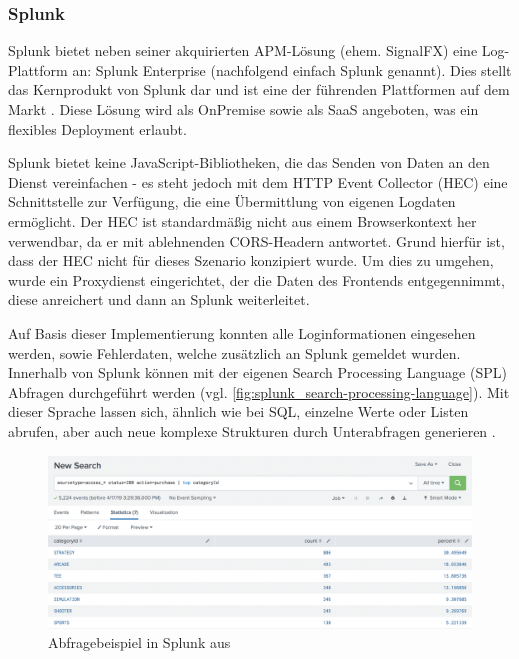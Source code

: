 \subsubsection{Splunk}
\label{subsec:splunk}

Splunk bietet neben seiner akquirierten APM-Lösung (ehem. SignalFX) eine Log-Plattform an: Splunk Enterprise (nachfolgend einfach Splunk genannt). Dies stellt das Kernprodukt von Splunk dar und ist eine der führenden Plattformen auf dem Markt \cite{ThreatIdentificationFromAccessLogsUsingElasticStack}. Diese Lösung wird als OnPremise sowie als SaaS angeboten, was ein flexibles Deployment erlaubt.

Splunk bietet keine JavaScript-Bibliotheken, die das Senden von Daten an den Dienst vereinfachen - es steht jedoch mit dem HTTP Event Collector (HEC) \cite{SplunkHEC} eine Schnittstelle zur Verfügung, die eine Übermittlung von eigenen Logdaten ermöglicht. Der HEC ist standardmäßig nicht aus einem Browserkontext her verwendbar, da er mit ablehnenden CORS-Headern antwortet. Grund hierfür ist, dass der HEC nicht für dieses Szenario konzipiert wurde. Um dies zu umgehen, wurde ein Proxydienst eingerichtet, der die Daten des Frontends entgegennimmt, diese anreichert und dann an Splunk weiterleitet.

Auf Basis dieser Implementierung konnten alle Loginformationen eingesehen werden, sowie Fehlerdaten, welche zusätzlich an Splunk gemeldet wurden. Innerhalb von Splunk können mit der eigenen Search Processing Language (SPL) \cite{SplunkSPL} Abfragen durchgeführt werden (vgl. \autoref{fig:splunk_search-processing-language}). Mit dieser Sprache lassen sich, ähnlich wie bei SQL, einzelne Werte oder Listen abrufen, aber auch neue komplexe Strukturen durch Unterabfragen generieren \cite{SplunkSQLtoSPL}.

\begin{figure}[H]
	\centering
	\includegraphics[width=\linewidth]{img/03_methoden/splunk_search-processing-language.png}
	\caption{Abfragebeispiel in Splunk aus \cite{SplunkSPL}}
	\label{fig:splunk_search-processing-language}
\end{figure}


